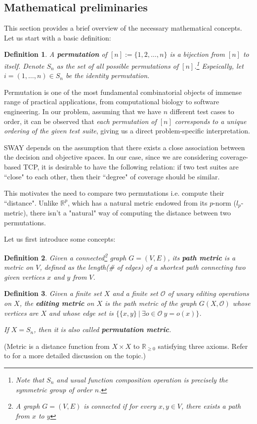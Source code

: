 \documentclass[10pt,journal,compsoc]{IEEEtran}
\newtheorem{definition}{Definition}[section]
\begin{document}
	\subsection{Mathematical preliminaries}
	This section provides a brief overview of the necessary mathematical concepts.
	Let us start with a basic definition:
	\begin{definition}
		A {\bf permutation} of $[n] := \{1, 2, \dots, n\}$ is a bijection from $[n]$ to itself.
		Denote $S_n$ as the set of all possible permutations of $[n]$.\footnote{Note that $S_n$ and usual function composition operation is precisely the symmetric group of order $n$.}
		Espeically, let $i = (1, \dots, n) \in S_n$ be the identity permutation.
	\end{definition}
	
	Permutation is one of the most fundamental combinatorial objects of immense range of practical applications, from computational biology to software engineering.
	In our problem, assuming that we have $n$ different test cases to order, it can be observed that {\it each permutation of $[n]$ corresponds to a unique ordering of the given test suite}, giving us a direct problem-specific interpretation.
	
	SWAY depends on the assumption that there exists a close association between the decision and objective spaces.
	In our case, since we are considering coverage-based TCP, it is desirable to have the following relation: if two test suites are ``close" to each other, then their ``degree" of coverage should be similar.
	
	This motivates the need to compare two permutations i.e. compute their ``distance".
	Unlike $\mathbb{R}^p$, which has a natural metric endowed from its $p$-norm ($l_p$-metric), there isn't a "natural" way of computing the distance between two permutations.
	
	Let us first introduce some concepts\cite{DD18}:
	\begin{definition}
		Given a connected\footnote{A graph $G = (V, E)$ is connected if for every $x, y \in V$, there exists a path from $x$ to $y$} graph $G = (V, E)$, its {\bf path metric} is a metric on $V$, defined as the length(\# of edges) of a shortest path connecting two given vertices $x$ and $y$ from $V$.
	\end{definition}
	\begin{definition}
		Given a finite set $X$ and a finite set $\mathcal{O}$ of unary editing operations on $X$, the {\bf editing metric} on $X$ is the path metric of the graph $G(X, \mathcal{O})$ whose vertices are $X$ and whose edge set is $\{ \{x, y\} \ | \ \exists o \in \mathcal{O} \ y = o(x) \}$.
		
		If $X = S_n$, then it is also called {\bf permutation metric}.
	\end{definition}
	(Metric is a distance function from $X \times X$ to $\mathbb{R}_{\geq 0}$ satisfying three axioms.
	Refer to \cite{pma} for a more detailed discussion on the topic.)
	
\end{document}
